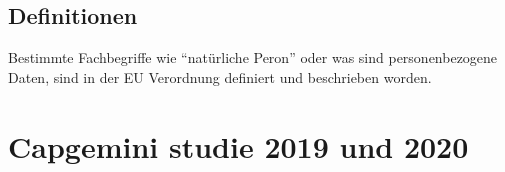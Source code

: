 \subsection{Definitionen}
Bestimmte Fachbegriffe wie "`natürliche Peron"' oder was sind personenbezogene Daten, sind in der EU Verordnung definiert und beschrieben worden.

\paragraph{}

\section{Capgemini studie 2019 und 2020}

\newpage
